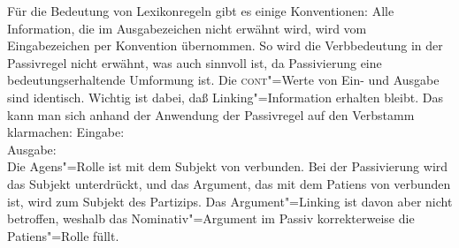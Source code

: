 \noindent
Für die Bedeutung von Lexikonregeln gibt es einige Konventionen: Alle Information, 
die im Ausgabezeichen nicht erwähnt wird, wird vom Eingabezeichen per Konvention übernommen.
So wird \zb die Verbbedeutung in der Passivregel nicht erwähnt, was auch sinnvoll ist,
da Passivierung eine bedeutungserhaltende Umformung ist. Die \textsc{cont}"=Werte von Ein- und Ausgabe sind identisch.
Wichtig ist dabei, daß Linking"=Information erhalten bleibt. Das kann man sich anhand der Anwendung
der Passivregel auf den Verbstamm  klarmachen:
\eal
\label{lr-passiv-beispiel}
\ex Eingabe:\\
\ex Ausgabe:\\
\zl
Die Agens"=Rolle ist mit dem Subjekt von  verbunden. Bei der Passivierung wird
das Subjekt unterdrückt, und das Argument, das mit dem Patiens von  verbunden
ist, wird zum Subjekt des Partizips. Das Argument"=Linking ist davon aber nicht betroffen,
weshalb das Nominativ"=Argument im Passiv korrekterweise die Patiens"=Rolle füllt.

